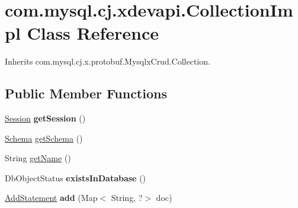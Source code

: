 \hypertarget{classcom_1_1mysql_1_1cj_1_1xdevapi_1_1_collection_impl}{}\section{com.\+mysql.\+cj.\+xdevapi.\+Collection\+Impl Class Reference}
\label{classcom_1_1mysql_1_1cj_1_1xdevapi_1_1_collection_impl}


Inherits com.\+mysql.\+cj.\+x.\+protobuf.\+Mysqlx\+Crud.\+Collection.

\subsection*{Public Member Functions}
\begin{DoxyCompactItemize}
\item 
\mbox{\label{classcom_1_1mysql_1_1cj_1_1xdevapi_1_1_collection_impl_aae4626274d39779ff51b26441b362eea}} 
\mbox{\hyperlink{interfacecom_1_1mysql_1_1cj_1_1xdevapi_1_1_session}{Session}} {\bfseries get\+Session} ()
\item 
\mbox{\hyperlink{interfacecom_1_1mysql_1_1cj_1_1xdevapi_1_1_schema}{Schema}} \mbox{\hyperlink{classcom_1_1mysql_1_1cj_1_1xdevapi_1_1_collection_impl_a742cc33a72a7d2c8c8c88d0a5be7bc14}{get\+Schema}} ()
\item 
String \mbox{\hyperlink{classcom_1_1mysql_1_1cj_1_1xdevapi_1_1_collection_impl_acc988f8c9117edcd62a08b77dc9e2dde}{get\+Name}} ()
\item 
\mbox{\label{classcom_1_1mysql_1_1cj_1_1xdevapi_1_1_collection_impl_a0ea2f07a5a443cd2bc331d3b8c424ff9}} 
Db\+Object\+Status {\bfseries exists\+In\+Database} ()
\item 
\mbox{\label{classcom_1_1mysql_1_1cj_1_1xdevapi_1_1_collection_impl_a66d3e972cdbc3ab751a4ebbca12ca57e}} 
\mbox{\hyperlink{interfacecom_1_1mysql_1_1cj_1_1xdevapi_1_1_add_statement}{Add\+Statement}} {\bfseries add} (Map$<$ String, ?$>$ doc)
\item 
\mbox{\label{classcom_1_1mysql_1_1cj_1_1xdevapi_1_1_collection_impl_a8a5eb95ee49f4281ee578cb161b186d7}} 

\end{DoxyCompactItemize}
